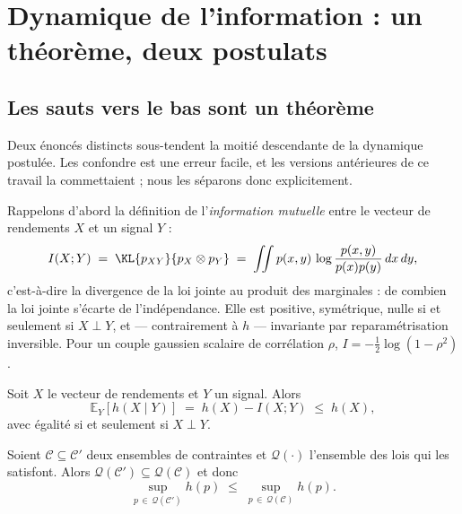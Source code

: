 \section{Dynamique de l'information : un théorème, deux postulats}
\label{sec:dynamics}

\subsection{Les sauts vers le bas sont un théorème}

Deux énoncés distincts sous-tendent la moitié descendante de la dynamique
postulée. Les confondre est une erreur facile, et les versions antérieures de ce
travail la commettaient ; nous les séparons donc explicitement.

Rappelons d'abord la définition de l'\emph{information mutuelle} entre le
vecteur de rendements $X$ et un signal $Y$ :
\begin{equation}
\label{eq:mi}
I(X;Y) \;=\; \KL{p_{XY}}{p_X\otimes p_Y}
\;=\; \iint p(x,y)\,\log\frac{p(x,y)}{p(x)p(y)}\,dx\,dy ,
\end{equation}
c'est-à-dire la divergence de la loi jointe au produit des marginales : de
combien la loi jointe s'écarte de l'indépendance. Elle est positive, symétrique,
nulle si et seulement si $X\perp Y$, et --- contrairement à $h$ --- invariante par
reparamétrisation inversible. Pour un couple gaussien scalaire de corrélation
$\rho$, $I=-\tfrac12\log(1-\rho^2)$.

\begin{proposition}
\label{prop:conditioning}
Soit $X$ le vecteur de rendements et $Y$ un signal. Alors
\begin{equation*}
\mathbb{E}_Y\!\left[h(X\mid Y)\right] \;=\; h(X) - I(X;Y) \;\le\; h(X),
\end{equation*}
avec égalité si et seulement si $X\perp Y$.
\end{proposition}

\begin{proposition}
\label{prop:constraint}
Soient $\mathcal{C}\subseteq\mathcal{C}'$ deux ensembles de contraintes et
$\mathcal{Q}(\cdot)$ l'ensemble des lois qui les satisfont. Alors
$\mathcal{Q}(\mathcal{C}')\subseteq\mathcal{Q}(\mathcal{C})$ et donc
\begin{equation*}
\sup_{p\,\in\,\mathcal{Q}(\mathcal{C}')} h(p) \;\le\; \sup_{p\,\in\,\mathcal{Q}(\mathcal{C})} h(p).
\end{equation*}
\end{proposition}


